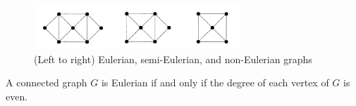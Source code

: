 \begin{figure}[ht]
  \begin{center}
    \includegraphics[width=0.69\textwidth]{figures/l02/eulerian-graphs}
  \end{center}
  \caption{(Left to right) Eulerian, semi-Eulerian, and non-Eulerian graphs}\label{fig:eulerian-graphs}
\end{figure}

\begin{theorem}[Euler, 1736]
  A connected graph \(G\) is Eulerian if and only if the degree of each vertex 
  of \(G\) is even.
\end{theorem}

